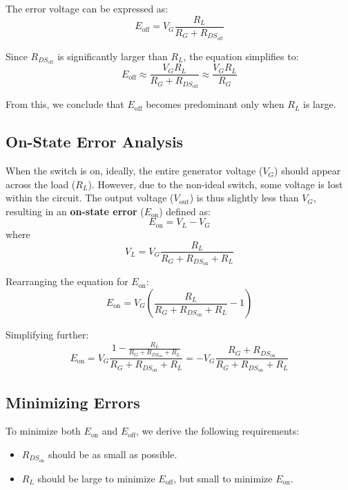 \documentclass[a4paper,9pt,twoside,openany,twocolumn]{memoir}
\begin{document}
The error voltage can be expressed as:
\begin{equation}
E_{\text{off}} = V_G \frac{R_L}{R_G + R_{DS_{\text{off}}}}
\end{equation}

Since \( R_{DS_{\text{off}}} \) is significantly larger than \( R_L \), the equation simplifies to:
\begin{equation}
E_{\text{off}} \approx \frac{V_G R_L}{R_G + R_{DS_{\text{off}}}} \approx \frac{V_G R_L}{R_G}
\end{equation}

From this, we conclude that \( E_{\text{off}} \) becomes predominant only when \( R_L \) is large.

\subsection{On-State Error Analysis}
When the switch is on, ideally, the entire generator voltage (\( V_G \)) should appear across the load (\( R_L \)). However, due to the non-ideal switch, some voltage is lost within the circuit. The output voltage (\( V_{\text{out}} \)) is thus slightly less than \( V_G \), resulting in an \textbf{on-state error} (\( E_{\text{on}} \)) defined as:
\begin{equation}
E_{\text{on}} = V_L - V_G
\end{equation}
where
\begin{equation}
V_L = V_G \frac{R_L}{R_G + R_{DS_{\text{on}}} + R_L}
\end{equation}

Rearranging the equation for \( E_{\text{on}} \):
\begin{equation}
E_{\text{on}} = V_G \left( \frac{R_L}{R_G + R_{DS_{\text{on}}} + R_L} - 1 \right )
\end{equation}

Simplifying further:
\begin{equation}
E_{\text{on}} = V_G \frac{1 - \frac{R_L}{R_G + R_{DS_{\text{on}}} + R_L}}{R_G + R_{DS_{\text{on}}} + R_L} = -V_G \frac{R_G + R_{DS_{\text{on}}}}{R_G + R_{DS_{\text{on}}} + R_L}
\end{equation}

\subsection{Minimizing Errors}
To minimize both \( E_{\text{on}} \) and \( E_{\text{off}} \), we derive the following requirements:
\begin{itemize}
    \item \( R_{DS_{\text{on}}} \) should be as small as possible.
    \item \( R_L \) should be large to minimize \( E_{\text{off}} \), but small to minimize \( E_{\text{on}} \).
\end{itemize}
\end{document}
